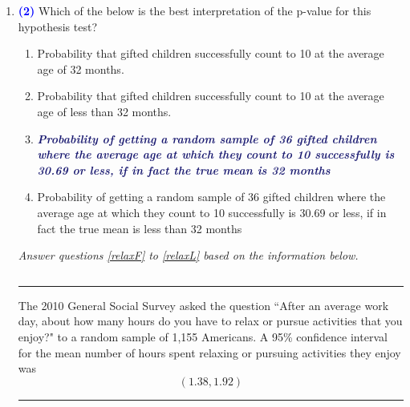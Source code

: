 \documentclass[11pt]{article}
\newcommand{\solnMult}[1]{\textbf{\textcolor{MidnightBlue}{\textit{#1}}}}	%
\newcommand{\pts}[1]{ \textbf{{\footnotesize \textcolor{blue}{(#1)}}} }	%
\begin{document}
\begin{enumerate}
\begin{multicols}{2}
\begin{enumerate}
\item Less than 0.005
\item \solnMult{Between 0.025 and 0.05}
\item Between 0.05 and 0.1
\item Greater than 0.1
\end{enumerate}
\end{multicols}

\item \pts{2}  \label{countL} Which of the below is the best interpretation of the p-value for this hypothesis test?

\begin{enumerate}
\item Probability that gifted children successfully count to 10 at the average age of 32 months.
\item Probability that gifted children successfully count to 10 at the average age of less than 32 months.
\item \solnMult{Probability of getting a random sample of 36 gifted children where the average age at which they count to 10 successfully is 30.69 or less, if in fact the true mean is 32 months}
\item Probability of getting a random sample of 36 gifted children where the average age at which they count to 10 successfully is 30.69 or less, if in fact the true mean is less than 32 months
\end{enumerate}

\vfill

\pagebreak

%



%

\pagebreak

\begin{center}
\textit{Answer questions \ref{relaxF} to \ref{relaxL} based on the information below.}
\end{center}
$\:$
\hrule
The 2010 General Social Survey asked the question ``After an average work day, about how many hours do you have to relax or pursue activities that you enjoy?" to a random sample of 1,155 Americans. A 95\% confidence interval for the mean number of hours spent relaxing or pursuing activities they enjoy was	
\[ (1.38, 1.92) \]
\hrule
$\:$



\end{enumerate}
\end{document}
